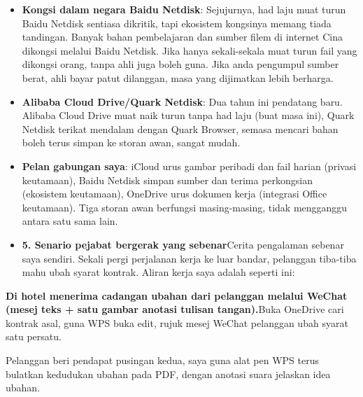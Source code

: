 \begin{itemize}
  \item \textbf{Kongsi dalam negara Baidu Netdisk}: Sejujurnya, had laju muat turun Baidu Netdisk sentiasa dikritik, tapi ekosistem kongsinya memang tiada tandingan. Banyak bahan pembelajaran dan sumber filem di internet Cina dikongsi melalui Baidu Netdisk. Jika hanya sekali-sekala muat turun fail yang dikongsi orang, tanpa ahli juga boleh guna. Jika anda pengumpul sumber berat, ahli bayar patut dilanggan, masa yang dijimatkan lebih berharga.
  \item \textbf{Alibaba Cloud Drive/Quark Netdisk}: Dua tahun ini pendatang baru. Alibaba Cloud Drive muat naik turun tanpa had laju (buat masa ini), Quark Netdisk terikat mendalam dengan Quark Browser, semasa mencari bahan boleh terus simpan ke storan awan, sangat mudah.
  \item \textbf{Pelan gabungan saya}: iCloud urus gambar peribadi dan fail harian (privasi keutamaan), Baidu Netdisk simpan sumber dan terima perkongsian (ekosistem keutamaan), OneDrive urus dokumen kerja (integrasi Office keutamaan). Tiga storan awan berfungsi masing-masing, tidak mengganggu antara satu sama lain.
  \item \textbf{5. Senario pejabat bergerak yang sebenar}Cerita pengalaman sebenar saya sendiri. Sekali pergi perjalanan kerja ke luar bandar, pelanggan tiba-tiba mahu ubah syarat kontrak. Aliran kerja saya adalah seperti ini:
\end{itemize}

\textbf{Di hotel menerima cadangan ubahan dari pelanggan melalui WeChat (mesej teks + satu gambar anotasi tulisan tangan).}Buka OneDrive cari kontrak asal, guna WPS buka edit, rujuk mesej WeChat pelanggan ubah syarat satu persatu.


Pelanggan beri pendapat pusingan kedua, saya guna alat pen WPS terus bulatkan kedudukan ubahan pada PDF, dengan anotasi suara jelaskan idea ubahan.

